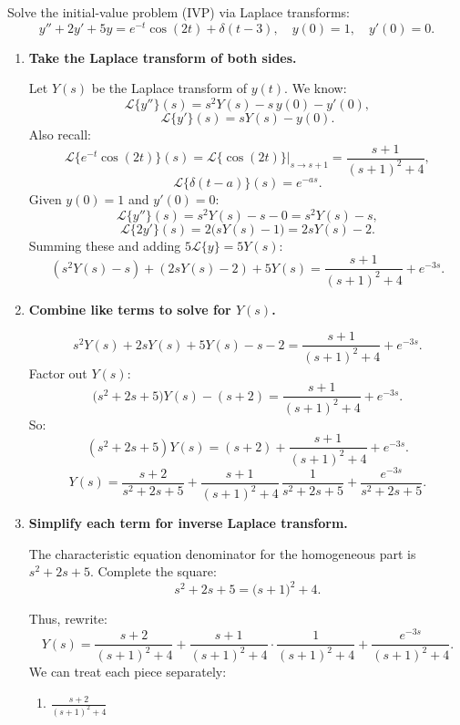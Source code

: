 \begin{example}
Solve the initial-value problem (IVP) via Laplace transforms:
\[
y'' + 2y' + 5y 
= e^{-t}\cos(2t) + \delta(t - 3),
\quad y(0) = 1,
\quad y'(0) = 0.
\]

\begin{solution}
\begin{enumerate}
\item \textbf{Take the Laplace transform of both sides.}

   Let $Y(s)$ be the Laplace transform of $y(t)$. We know:
   \[
   \mathcal{L}\{y''\}(s) = s^2Y(s) - s\,y(0) - y'(0),
   \]
   \[
   \mathcal{L}\{y'\}(s) = sY(s) - y(0).
   \]
   Also recall:
   \[
   \mathcal{L}\{e^{-t}\cos(2t)\}(s) 
   = \mathcal{L}\{\cos(2t)\}\bigg|_{s \to s+1}
   = \frac{s+1}{(s+1)^2 + 4},
   \]
   \[
   \mathcal{L}\{\delta(t - a)\}(s) = e^{-as}.
   \]
   Given $y(0) = 1$ and $y'(0)=0$:
   \[
   \mathcal{L}\{y''\}(s) 
   = s^2Y(s) - s - 0 
   = s^2Y(s) - s,
   \]
   \[
   \mathcal{L}\{2y'\}(s) 
   = 2\bigl(sY(s) - 1\bigr) 
   = 2sY(s) - 2.
   \]
   Summing these and adding $5\mathcal{L}\{y\}=5Y(s)$:
   \[
   (s^2Y(s) - s) 
   + (2sY(s) - 2) 
   + 5Y(s)
   = \frac{s+1}{(s+1)^2 + 4} + e^{-3s}.
   \]

\item \textbf{Combine like terms to solve for $Y(s)$.}

   \[
   s^2Y(s) + 2sY(s) + 5Y(s) 
   - s - 2 
   = \frac{s+1}{(s+1)^2 + 4} + e^{-3s}.
   \]
   Factor out $Y(s)$:
   \[
   \bigl(s^2 + 2s + 5\bigr)Y(s) - (s + 2)
   = \frac{s+1}{(s+1)^2 + 4} + e^{-3s}.
   \]
   So:
   \[
   (s^2 + 2s + 5)Y(s) 
   = (s + 2) 
   + \frac{s+1}{(s+1)^2 + 4} 
   + e^{-3s}.
   \]
   \[
   Y(s) = \frac{s + 2}{s^2 + 2s + 5} 
         + \frac{s+1}{(s+1)^2 + 4}\,\frac{1}{s^2 + 2s + 5}
         + \frac{e^{-3s}}{s^2 + 2s + 5}.
   \]

\item \textbf{Simplify each term for inverse Laplace transform.}

   The characteristic equation denominator for the homogeneous part is $s^2 + 2s + 5$. Complete the square:
   \[
   s^2 + 2s + 5 = \bigl(s+1\bigr)^2 + 4.
   \]

   Thus, rewrite:
   \[
   Y(s) 
   = \frac{s + 2}{(s+1)^2 + 4}
     + \frac{s+1}{(s+1)^2 + 4} 
       \cdot \frac{1}{(s+1)^2 + 4} 
     + \frac{e^{-3s}}{(s+1)^2 + 4}.
   \]
   We can treat each piece separately:

   \begin{enumerate}
   \item $\displaystyle \frac{s + 2}{(s+1)^2 + 4}$


\end{enumerate}
\end{enumerate}
\end{solution}
\end{example}
